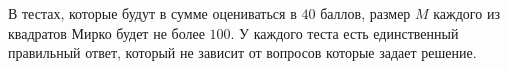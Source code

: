 В тестах, которые будут в сумме оцениваться в $40$ баллов,
размер $M$ каждого из квадратов Мирко будет не более $100$. У каждого теста есть единственный правильный ответ, который не зависит от вопросов которые задает решение.
